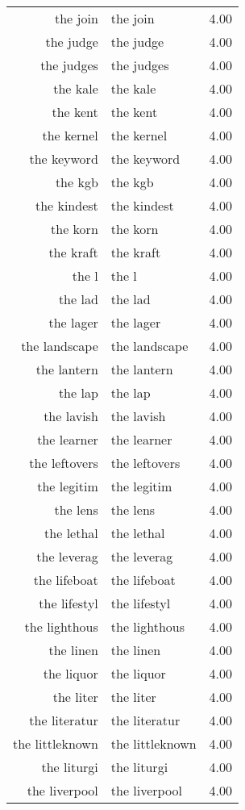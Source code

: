 \begin{table}[ht]
\begin{tabular}{rlr}
  the join & the join & 4.00 \\ 
  the judge & the judge & 4.00 \\ 
  the judges & the judges & 4.00 \\ 
  the kale & the kale & 4.00 \\ 
  the kent & the kent & 4.00 \\ 
  the kernel & the kernel & 4.00 \\ 
  the keyword & the keyword & 4.00 \\ 
  the kgb & the kgb & 4.00 \\ 
  the kindest & the kindest & 4.00 \\ 
  the korn & the korn & 4.00 \\ 
  the kraft & the kraft & 4.00 \\ 
  the l & the l & 4.00 \\ 
  the lad & the lad & 4.00 \\ 
  the lager & the lager & 4.00 \\ 
  the landscape & the landscape & 4.00 \\ 
  the lantern & the lantern & 4.00 \\ 
  the lap & the lap & 4.00 \\ 
  the lavish & the lavish & 4.00 \\ 
  the learner & the learner & 4.00 \\ 
  the leftovers & the leftovers & 4.00 \\ 
  the legitim & the legitim & 4.00 \\ 
  the lens & the lens & 4.00 \\ 
  the lethal & the lethal & 4.00 \\ 
  the leverag & the leverag & 4.00 \\ 
  the lifeboat & the lifeboat & 4.00 \\ 
  the lifestyl & the lifestyl & 4.00 \\ 
  the lighthous & the lighthous & 4.00 \\ 
  the linen & the linen & 4.00 \\ 
  the liquor & the liquor & 4.00 \\ 
  the liter & the liter & 4.00 \\ 
  the literatur & the literatur & 4.00 \\ 
  the littleknown & the littleknown & 4.00 \\ 
  the liturgi & the liturgi & 4.00 \\ 
  the liverpool & the liverpool & 4.00 \\ 

\end{tabular}
\end{table}
